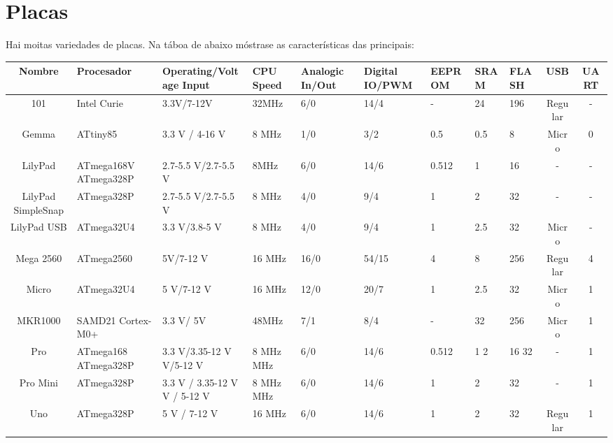 \documentclass[11pt,twoside]{book}
\begin{document}
\section{Placas}

Hai moitas variedades de placas. Na táboa de abaixo móstrase as características das principais:

\begin{table}[htb]
\begin{center}
\resizebox{16cm}{!} {
\begin{tabular}{|c|m{3cm}|m{3.5cm}|m{2cm}|m{2cm}|m{2cm}|m{2cm}|m{2cm}|m{2cm}|c|c|}
\hline
Nombre & Procesador & Operating/Voltage Input & CPU Speed & Analogic In/Out & Digital IO/PWM & EEPROM & SRAM & FLASH & USB & UART \\
\hline
101 & Intel Curie & 3.3V/7-12V & 32MHz & 6/0 & 14/4 & - & 24 & 196 & Regular & - \\ 
\hline
Gemma & ATtiny85 & 3.3 V / 4-16 V & 8 MHz & 1/0 & 3/2 & 0.5 & 0.5 & 8 & Micro & 0 \\
\hline
LilyPad & ATmega168V \newline ATmega328P & 2.7-5.5 V/2.7-5.5 V & 8MHz & 6/0 & 14/6 & 0.512 & 1 & 16 & - & - \\
\hline
LilyPad SimpleSnap & ATmega328P & 2.7-5.5 V/2.7-5.5 V & 8 MHz & 4/0 & 9/4 & 1 & 2 & 32 & - & - \\
\hline
LilyPad USB & ATmega32U4 & 3.3 V/3.8-5 V & 8 MHz & 4/0 & 9/4 & 1 & 2.5 & 32 & Micro & - \\
\hline
Mega 2560 & ATmega2560 & 5V/7-12 V & 16 MHz & 16/0 & 54/15 & 4 & 8 & 256 & Regular & 4 \\
\hline
Micro & ATmega32U4 & 5 V/7-12 V & 16 MHz & 12/0 & 20/7 & 1 & 2.5 & 32 & Micro & 1 \\
\hline
MKR1000 & SAMD21 Cortex-M0+ & 3.3 V/ 5V  & 48MHz  & 7/1 & 8/4 & - & 32 & 256 & Micro & 1 \\
\hline
Pro & ATmega168 ATmega328P & 3.3 V/3.35-12 V \newline  5 V/5-12 V & 8 MHz  \newline  16 MHz & 6/0 & 14/6 & 0.512 \newline 1 & 1   2 & 16  32 & - & 1 \\
\hline
Pro Mini & ATmega328P & 3.3 V / 3.35-12 V \newline  5 V / 5-12 V & 8 MHz \newline  16 MHz & 6/0 & 14/6 & 1 & 2 & 32 & - & 1 \\
\hline
Uno & ATmega328P & 5 V / 7-12 V & 16 MHz & 6/0 & 14/6 & 1 & 2 & 32 & Regular & 1 \\

\end{tabular}}
\end{center}
\end{table}
\end{document}
